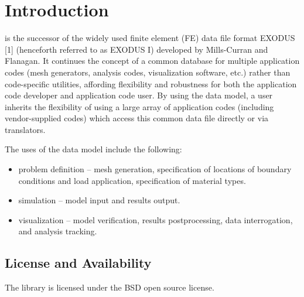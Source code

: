  \chapter{Introduction}

\exo{} is the successor of the widely used finite element 
(FE) data file format EXODUS [1] (henceforth referred to as EXODUS I)
developed by Mills-Curran and Flanagan. It continues the concept of a
common database for multiple application codes (mesh generators,
analysis codes, visualization software, etc.) rather than
code-specific utilities, affording flexibility and robustness for both
the application code developer and application code user. By using the
\exo{} data model, a user inherits the flexibility of using a large
array of application codes (including vendor-supplied codes) which
access this common data file directly or via translators.

The uses of the \exo{} data model include the following:

\begin{itemize}
 \item problem definition -- mesh generation, specification 
of locations of boundary conditions and load application, specification 
of material types.
\item simulation -- model input and results output.
\item visualization -- model verification, results postprocessing, 
data interrogation, and analysis tracking.
\end{itemize}

\section{License and Availability}
The \exo{} library is licensed under the BSD open source license.

